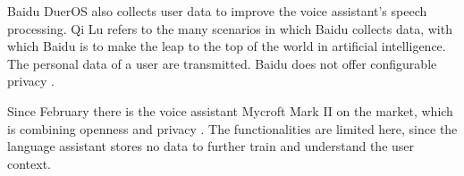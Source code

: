 Baidu DuerOS also collects user data to improve the voice assistant's speech processing. Qi Lu refers to the many scenarios in which Baidu collects data, with which Baidu is to make the leap to the top of the world in artificial intelligence. The personal data of a user are transmitted. Baidu does not offer configurable privacy \cite{baiduAI}.

Since February there is the voice assistant Mycroft Mark II on the market, which is combining openness and privacy \cite{mycroftsmartspeaker}. The functionalities are limited here, since the language assistant stores no data to further train and understand the user context.
